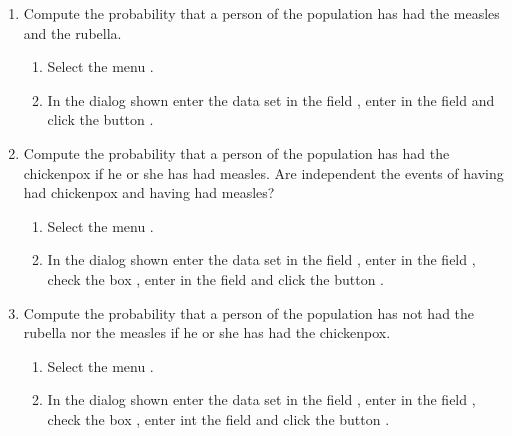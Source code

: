 \begin{enumerate}[leftmargin=*]
\begin{enumerate}
\item Compute the probability that a person of the population has had the measles and the rubella. 
\begin{indication}
\begin{enumerate}
\item Select the menu .
\item In the dialog shown enter the data set  in the field , enter
 in the field  and click the button .
\end{enumerate}
\end{indication} 

\item Compute the probability that a person of the population has had the chickenpox if he or she has had measles.
Are independent the events of having had chickenpox and having had measles?
\begin{indication}
\begin{enumerate}
\item Select the menu .
\item In the dialog shown enter the data set  in the field , enter
 in the field , check the box , enter  in the field  and click the button .
\end{enumerate}
\end{indication} 

\item Compute the probability that a person of the population has not had the rubella nor the measles if he or she has had the chickenpox. 
\begin{indication}
\begin{enumerate}
\item Select the menu .
\item In the dialog shown enter the data set  in the field , enter
 in the field , check the box , enter  int the field  and click the button .
\end{enumerate}
\end{indication} 
\end{enumerate}



\end{enumerate}
